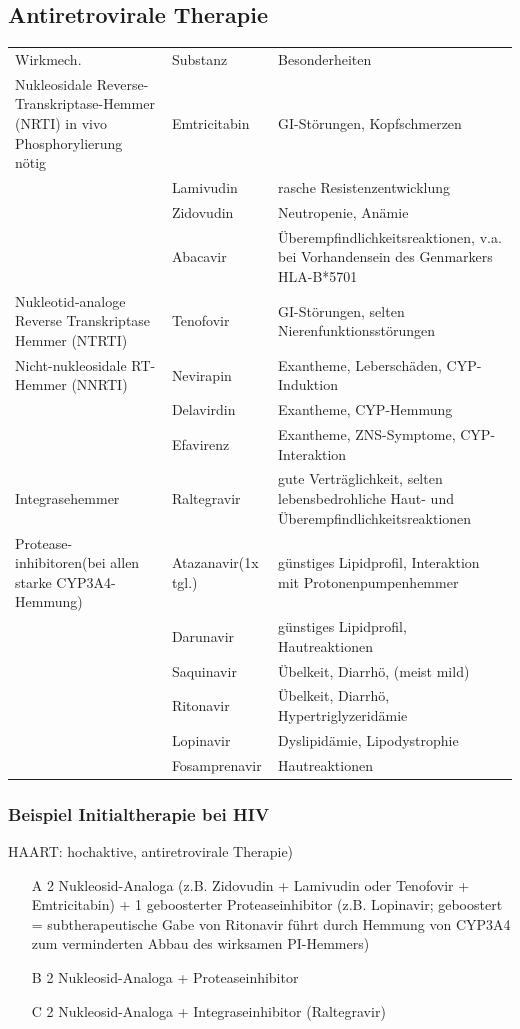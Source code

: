 \documentclass[10pt,a4paper]{report}
\begin{document}
\subsection{Antiretrovirale Therapie} %
\label{sub:antiretrovirale_therapie}
\begin{tabularx}{\textwidth}{XlX}
Wirkmech.&Substanz&Besonderheiten\\
Nukleosidale Reverse-Transkriptase-Hemmer (NRTI) in vivo Phosphorylierung nötig&Emtricitabin&GI-Störungen, Kopfschmerzen\\
&Lamivudin&rasche Resistenzentwicklung\\
&Zidovudin&Neutropenie, Anämie\\
&Abacavir&Überempfindlichkeitsreaktionen, v.a. bei Vorhandensein des Genmarkers HLA-B*5701\\
Nukleotid-analoge Reverse Transkriptase Hemmer (NTRTI)&Tenofovir&GI-Störungen, selten Nierenfunktionsstörungen\\
Nicht-nukleosidale RT-Hemmer (NNRTI)&Nevirapin&Exantheme, Leberschäden, CYP-Induktion\\
&Delavirdin&Exantheme, CYP-Hemmung\\
&Efavirenz&Exantheme, ZNS-Symptome, CYP-Interaktion\\
Integrasehemmer&Raltegravir&gute Verträglichkeit, selten lebensbedrohliche Haut- und Überempfindlichkeitsreaktionen\\
Protease-inhibitoren(bei allen starke CYP3A4-Hemmung)&Atazanavir(1x tgl.)&günstiges Lipidprofil, Interaktion mit Protonenpumpenhemmer\\
&Darunavir&günstiges Lipidprofil, Hautreaktionen\\
&Saquinavir&Übelkeit, Diarrhö, (meist mild)\\
&Ritonavir&Übelkeit, Diarrhö, Hypertriglyzeridämie\\
&Lopinavir&Dyslipidämie, Lipodystrophie\\
&Fosamprenavir&Hautreaktionen\\
\end{tabularx}
\subsubsection{Beispiel Initialtherapie bei HIV} %
\label{ssub:beispiel_initialtherapie_bei_hiv}
HAART: hochaktive, antiretrovirale Therapie)
\begin{itemize}
	\item[A]2 Nukleosid-Analoga (z.B. Zidovudin + Lamivudin oder Tenofovir + Emtricitabin) + 1 geboosterter Proteaseinhibitor (z.B. Lopinavir; geboostert = subtherapeutische Gabe von Ritonavir führt durch Hemmung von CYP3A4 zum verminderten Abbau des wirksamen PI-Hemmers)
	\item[B]2 Nukleosid-Analoga + Proteaseinhibitor
	\item[C]2 Nukleosid-Analoga + Integraseinhibitor (Raltegravir)
\end{itemize}
\end{document}

